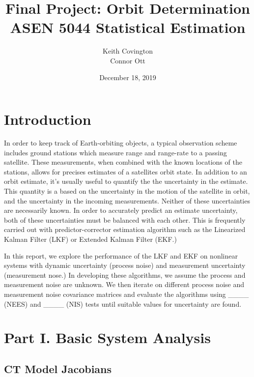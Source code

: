 \documentclass[11pt, a4paper]{article}
\begin{document}
\title{Final Project: Orbit Determination\\ ASEN 5044 Statistical Estimation}
\author{Keith Covington\\Connor Ott}
\date{December 18, 2019}
\maketitle



\section*{Introduction}
In order to keep track of Earth-orbiting objects, a typical observation scheme includes ground stations which measure range and range-rate to a passing satellite. 
These measurements, when combined with the known locations of the stations, allows for precises estimates of a satellites orbit state. 
In addition to an orbit estimate, it's usually useful to quantify the the uncertainty in the estimate. 
This quantity is a based on the uncertainty in the motion of the satellite in orbit, and the uncertainty in the incoming measurements. 
Neither of these uncertainties are necessarily known.
In order to accurately predict an estimate uncertainty, both of these uncertainties must be balanced with each other. 
This is frequently carried out with predictor-corrector estimation algorithm such as the Linearized Kalman Filter (LKF) or Extended Kalman Filter (EKF.)

In this report, we explore the performance of the LKF and EKF on nonlinear systems with dynamic uncertainty (process noise) and measurement uncertainty (measurement nose.) 
In developing these algorithms, we assume the process and measurement noise are unknown.
We then iterate on different process noise and measurement noise covariance matrices and evaluate the algorithms using \_\_\_\_ (NEES) and \_\_\_\_ (NIS) tests until suitable values for uncertainty are found. 

\section{Part I. Basic System Analysis}

\subsection{CT Model Jacobians}
\end{document}
